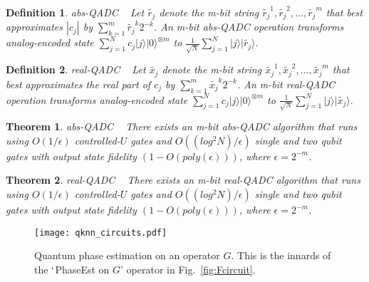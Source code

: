 \documentclass[a4paper,twocolumn,11pt,unpublished]{quantumarticle}
\newcommand{\rang}{\rangle}
\newtheorem{definition}{Definition}
\newtheorem{theorem}{Theorem}
\begin{document}
    \begin{definition}{abs-QADC}
        ~\cite{Mitarai2019} Let $\widetilde{r_j}$ denote the m-bit string $\widetilde{r_j} ^ {1}, \widetilde{r_j} ^ {2}, \dots , \widetilde{r_j} ^ {m}$ that best approximates $|c_j|$ by $\sum \limits_{k = 1}^{m} \widetilde{r_j} ^ {k} 2 ^ {-k}$. An m-bit abs-QADC operation transforms analog-encoded state $\sum \limits_{j = 1} ^ {N} c_j |j\rang |0\rang ^ {\otimes m} $ to $\frac{1}{\sqrt{N}} \sum \limits_{j = 1} ^ {N} |j\rangle |\widetilde{r_j} \rangle.$
        
        
    \end{definition}
    
    \begin{definition}{real-QADC}
        ~\cite{Mitarai2019} Let $\widetilde{x_j}$ denote the m-bit string $\widetilde{x_j} ^ {1}, \widetilde{x_j} ^ {2}, \dots , \widetilde{x_j} ^ {m}$ that best approximates the real part of $c_j$ by $\sum \limits_{k = 1}^{m} \widetilde{x_j} ^ {k} 2 ^ {-k}$. An m-bit real-QADC operation transforms analog-encoded state $\sum \limits_{j = 1} ^ {N} c_j |j\rangle |0\rangle ^ {\otimes m} $ to $\frac{1}{\sqrt{N}} \sum \limits_{j = 1} ^ {N} |j\rang |\widetilde{x_j}\rang.$
    \end{definition}

    \begin{theorem}{abs-QADC}
        ~\cite{Mitarai2019} There exists an m-bit abs-QADC algorithm that runs using $O(1/\epsilon)$ controlled-$U$ gates and $O((log^2N)/\epsilon)$ single and two qubit gates with output state fidelity $(1 - O(poly(\epsilon)))$, where $\epsilon = 2^{-m}$.
    \end{theorem}
    
    
    \begin{theorem}{real-QADC}
        ~\cite{Mitarai2019} There exists an m-bit real-QADC algorithm that runs using $O(1/\epsilon)$ controlled-$U$ gates and $O((log^2N)/\epsilon)$ single and two qubit gates with output state fidelity $(1 - O(poly(\epsilon)))$, where $\epsilon = 2^{-m}$.
    \end{theorem}


    \begin{figure*}
            \begin{center}
                \texttt{[image: qknn\_circuits.pdf]}
                \caption{Quantum phase estimation on an operator $G$. This is the innards of the $\lq$PhaseEst on $G$' operator in Fig.~\ref{fig:Fcircuit}.}
                \label{fig:PhaseEst}
            \end{center}
        \end{figure*}
\end{document}
